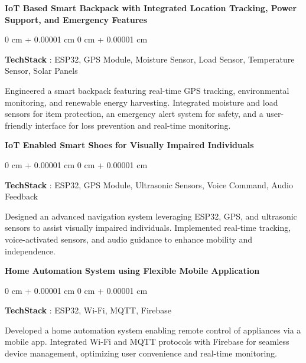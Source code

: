 \documentclass[10pt, letterpaper]{article}
\newenvironment{onecolentry}{
    \begin{adjustwidth}{
        0 cm + 0.00001 cm
    }{
        0 cm + 0.00001 cm
    }
}{
    \end{adjustwidth}
} %
\begin{document}
        \vspace{0.3 cm}
        \begin{samepage}
                \textbf{IoT Based Smart Backpack with Integrated Location Tracking, Power Support, and Emergency Features  }
            \vspace{0.05 cm}
            
            \begin{onecolentry}
               \textbf{TechStack} :  ESP32, GPS Module, Moisture Sensor, Load Sensor, Temperature Sensor, Solar Panels 

                \vspace{0.05 cm}
                Engineered a smart backpack featuring real-time GPS tracking, environmental monitoring, and renewable energy harvesting. Integrated moisture and load sensors for item protection, an emergency alert system for safety, and a user-friendly interface for loss prevention and real-time monitoring. 
        \end{onecolentry}
        \end{samepage}
         \vspace{0.3 cm}
         
         
  \begin{samepage}
                \textbf{IoT Enabled Smart Shoes for Visually Impaired Individuals    }
            \vspace{0.05cm}
            
            \begin{onecolentry}
               \textbf{TechStack} :  ESP32, GPS Module, Ultrasonic Sensors, Voice Command, Audio Feedback 

                \vspace{0.05 cm}
                Designed an advanced navigation system leveraging ESP32, GPS, and ultrasonic sensors to assist visually impaired individuals. Implemented real-time tracking, voice-activated sensors, and audio guidance to enhance mobility and independence.  
        \end{onecolentry}
        \end{samepage}
        \vspace{0.3cm}
        \begin{samepage}
                \textbf{Home Automation System using Flexible Mobile Application  }
            \vspace{0.05 cm}
            
            \begin{onecolentry}
               \textbf{TechStack} :  ESP32, Wi-Fi, MQTT, Firebase  

                \vspace{0.05 cm}
                Developed a home automation system enabling remote control of appliances via a mobile app. Integrated Wi-Fi and MQTT protocols with Firebase for seamless device management, optimizing user convenience and real-time monitoring. 
        \end{onecolentry}
        \end{samepage}
         
\end{document}

